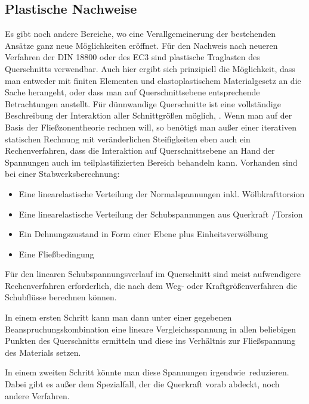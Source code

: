 {\textcolor{sectionTitleBlue}{\subsection{Plastische Nachweise}}}
Es gibt noch andere Bereiche, wo eine Verallgemeinerung der bestehenden Ans\"{a}tze ganz neue M\"{o}glichkeiten er\"{o}ffnet. F\"{u}r den Nachweis nach neueren Verfahren der DIN 18800 oder des EC3 sind plastische Traglasten des Querschnitts verwendbar. Auch hier ergibt sich prinzipiell die M\"{o}glichkeit, dass man entweder mit finiten Elementen und elastoplastischem Materialgesetz an die Sache herangeht, oder dass man auf Querschnittsebene entsprechende Betrachtungen anstellt. F\"{u}r d\"{u}nnwandige Querschnitte ist eine vollst\"{a}ndige Beschreibung der Interaktion aller Schnittgr\"{o}{\ss}en m\"{o}glich, \cite{Katz7}. Wenn man auf der Basis der Flie{\ss}zonentheorie rechnen will, so ben\"{o}tigt man au{\ss}er einer iterativen statischen Rechnung mit ver\"{a}nderlichen Steifigkeiten eben auch ein Rechenverfahren, dass die Interaktion auf Querschnittsebene an Hand der Spannungen auch im teilplastifizierten Bereich behandeln kann. Vorhanden sind bei einer Stabwerksberechnung:\\

\begin{itemize}
\item Eine linearelastische Verteilung der Normalspannungen inkl. W\"{o}lbkrafttorsion
\item Eine linearelastische Verteilung der Schubspannungen aus Querkraft /Torsion
\item Ein Dehnungszustand in Form einer Ebene plus Einheitsverw\"{o}lbung
\item Eine Flie{\ss}bedingung
\end{itemize}
F\"{u}r den linearen Schubspannungsverlauf im Querschnitt sind meist aufwendigere Rechenverfahren erforderlich, die nach dem Weg- oder Kraftgr\"{o}{\ss}enverfahren die Schubfl\"{u}sse berechnen k\"{o}nnen.

In einem ersten Schritt kann man dann unter einer gegebenen Beanspruchungskombination eine lineare Vergleichsspannung in allen beliebigen Punkten des Querschnitts ermitteln und diese ins Verh\"{a}ltnis zur Flie{\ss}spannung des Materials setzen.

In einem zweiten Schritt k\"{o}nnte man diese Spannungen \glq irgendwie\grq\ reduzieren. Dabei gibt es au{\ss}er dem Spezialfall, der die Querkraft vorab abdeckt, noch andere Verfahren.

